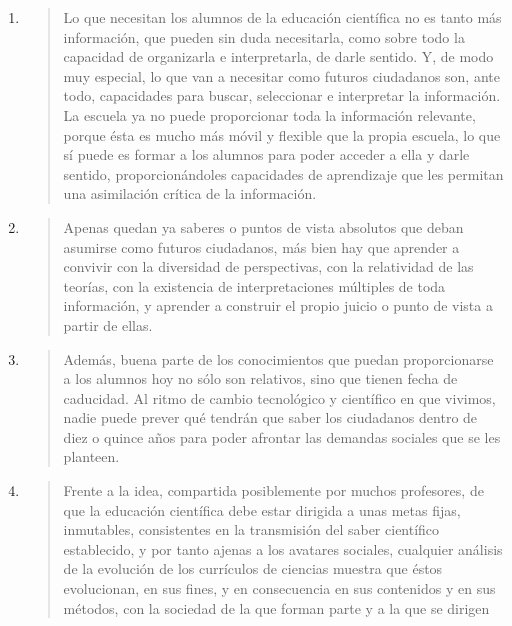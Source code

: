 \documentclass{article}
\begin{document}
\begin{enumerate}[label=\textbf{A\arabic*.}, leftmargin=*, itemsep=10pt]
  \item \begin{quote}
Lo que necesitan los alumnos de la educación científica no es tanto más información, que pueden sin duda necesitarla, como sobre todo la capacidad de organizarla e interpretarla, de darle sentido. Y, de modo muy especial, lo que van a necesitar como futuros ciudadanos son, ante todo, capacidades para buscar, seleccionar e interpretar la información. La escuela ya no puede proporcionar toda la información relevante, porque ésta es mucho más móvil y flexible que la propia escuela, lo que sí puede es formar a los alumnos para poder acceder a ella y darle sentido, proporcionándoles capacidades de aprendizaje que les permitan una asimilación crítica de la información.
  \end{quote}

  \item \begin{quote}
Apenas quedan ya saberes o puntos de vista absolutos que deban asumirse como futuros ciudadanos, más bien hay que aprender a convivir con la diversidad de perspectivas, con la relatividad de las teorías, con la existencia de interpretaciones múltiples de toda información, y aprender a construir el propio juicio o punto de vista a partir de ellas.
  \end{quote}

  \item \begin{quote}
Además, buena parte de los conocimientos que puedan proporcionarse a los alumnos hoy no sólo son relativos, sino que tienen fecha de caducidad. Al ritmo de cambio tecnológico y científico en que vivimos, nadie puede prever qué tendrán que saber los ciudadanos dentro de diez o quince años para poder afrontar las demandas sociales que se les planteen.
  \end{quote}

  \item \begin{quote}
Frente a la idea, compartida posiblemente por muchos profesores, de que la educación científica debe estar dirigida a unas metas fijas, inmutables, consistentes en la transmisión del saber científico establecido, y por tanto ajenas a los avatares sociales, cualquier análisis de la evolución de los currículos de ciencias muestra que éstos evolucionan, en sus fines, y en consecuencia en sus contenidos y en sus métodos, con la sociedad de la que forman parte y a la que se dirigen
  \end{quote}

\end{enumerate}


 
\end{document}
